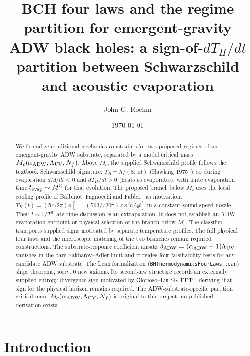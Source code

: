 \documentclass[prd,aps,twocolumn,floatfix,nofootinbib,superscriptaddress]{revtex4-2}
\newcommand{\Mc}{M_{c}}
\newcommand{\Thawk}{T_{H}}
\newcommand{\aADW}{\alpha_{\rm ADW}}
\newcommand{\Ladw}{\Lambda_{\rm UV}}
\newcommand{\Nf}{N_{f}}
\newcommand{\dADW}{\delta_{\rm ADW}}
\begin{document}
\title{BCH four laws and the regime partition for emergent-gravity ADW
black holes: a sign-of-$d\Thawk/dt$ partition between Schwarzschild
and acoustic evaporation}

\author{John G. Roehm}

\date{\today}

\begin{abstract}
We formalize conditional mechanics constraints for two proposed regimes
of an emergent-gravity ADW substrate,
separated by a model critical mass $\Mc(\aADW, \Ladw, \Nf)$.
Above $\Mc$, the supplied Schwarzschild profile
follows the textbook Schwarzschild signature: $\Thawk = \hbar/(8\pi M)$
(Hawking 1975~\cite{Hawking1975CMP}), so during evaporation
$dM/dt < 0$ and $d\Thawk/dt > 0$ (heats as evaporates), with
finite evaporation time $t_{\rm evap} \sim M^3$ for that evolution.
The proposed branch below $\Mc$ uses the local cooling profile of
Balbinot, Fagnocchi and Fabbri~\cite{Balbinot2005PRD} as motivation:
$\Thawk(t) = (\hbar c / 2\pi) \kappa [1 - (563/720\pi)\,\varepsilon\, \kappa^3 c
A_0 t]$ in a constant-sound-speed nozzle. Their $t \sim 1/T^3$
late-time discussion is an extrapolation. It does not establish an
ADW evaporation endpoint or physical selection of the branch below
$\Mc$. The classifier transports supplied signs motivated by separate
temperature profiles. The full physical four laws and the
microscopic matching of the two branches remain required constructions. The substrate-response
coefficient ansatz $\dADW = (\aADW - 1)\Ladw$ vanishes in the bare
Sakharov--Adler limit and provides four falsifiability tests for any
candidate ADW substrate. The Lean formalization
(\texttt{BHThermodynamicsFourLaws.lean}) ships \bhThermoTotal{} theorems,
\sorrycount{} sorry, 0 new axioms. Its second-law structure records
an externally supplied entropy-divergence sign motivated by
Glorioso--Liu SK-EFT~\cite{GloriosoLiu2018}; deriving that sign for
the physical horizon remains required.
The ADW-substrate-specific partition critical mass
$\Mc(\aADW, \Ladw, \Nf)$ is original to this project;
no published derivation exists.
\end{abstract}

\maketitle

\section{Introduction}
\label{sec:intro}
\end{document}
